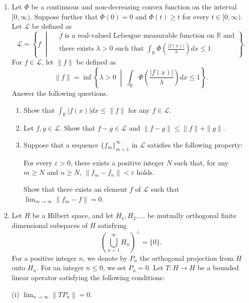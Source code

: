 \documentclass{article}
\begin{document}
\begin{enumerate}[label=\fbox{\arabic*}]
  \item %
        Let $\Phi$ be a continuous and non-decreasing convex function on the interval $[0, \infty)$. Suppose further that $\Phi(0) = 0$ and $\Phi(t) \ge t$ for every $t \in [0, \infty)$. Let $\mathcal{L}$ be defined as
        \[
          \mathcal{L} = \left\{ f \;\middle|\; \begin{aligned} &\text{$f$ is a real-valued Lebesgue measurable function on $\mathbb{R}$ and} \\ &\text{there exists $\lambda > 0$ such that $\int_{\mathbb{R}} \Phi\left( \frac{|f(x)|}{\lambda} \right) dx \le 1$} \end{aligned} \right\}.
        \]
        For $f \in \mathcal{L}$, let $\|f\|$ be defined as
        \[
          \|f\| = \inf \left\{ \lambda > 0 \;\middle|\; \int_{\mathbb{R}} \Phi\left( \frac{|f(x)|}{\lambda} \right) dx \le 1 \right\}.
        \]
        Answer the following questions.
        \begin{enumerate}[label=(\arabic*)]
          \item Show that $\int_{\mathbb{R}} |f(x)| dx \le \|f\|$ for any $f \in \mathcal{L}$.
          \item Let $f, g \in \mathcal{L}$. Show that $f - g \in \mathcal{L}$ and $\|f - g\| \le \|f\| + \|g\|$.
          \item Suppose that a sequence $\{f_m\}_{m=1}^\infty$ in $\mathcal{L}$ satisfies the following property:
          
          For every $\varepsilon > 0$, there exists a positive integer $N$ such that, for any $m \ge N$ and $n \ge N$, $\|f_m - f_n\| < \varepsilon$ holds.
          
          Show that there exists an element $f$ of $\mathcal{L}$ such that $\lim_{m \to \infty} \|f_m - f\| = 0$.
        \end{enumerate}

  \item %
        Let $H$ be a Hilbert space, and let $H_1, H_2, \dots$ be mutually orthogonal finite dimensional subspaces of $H$ satisfying
        \[
          \left( \bigcup_{n=1}^\infty H_n \right)^\perp = \{0\}.
        \]
        For a positive integer $n$, we denote by $P_n$ the orthogonal projection from $H$ onto $H_n$. For an integer $n \le 0$, we set $P_n = 0$.
        Let $T: H \to H$ be a bounded linear operator satisfying the following conditions:
        
        (i) $\lim_{n \to \infty} \|TP_n\| = 0$.
        

\end{enumerate}
\end{document}
